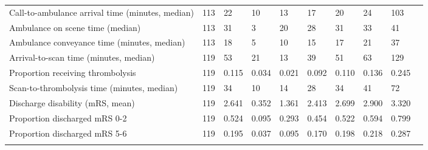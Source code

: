 \begin{minipage}{1\textwidth}
\begin{longtable}{p{7cm} p{1cm} p{0.8cm} p{0.8cm} p{0.8cm} p{0.8cm} p{0.8cm} p{0.8cm} p{0.8cm} p{0.8cm}}
Call-to-ambulance arrival time (minutes, median) & 113 & 22 & 10 & 13 & 17 & 20 & 24 & 103\tabularnewline
Ambulance on scene time (median) & 113 & 31 & 3 & 20 & 28 & 31 & 33 & 41\tabularnewline
Ambulance conveyance time (minutes, median) & 113 & 18 & 5 & 10 & 15 & 17 & 21 & 37\tabularnewline
Arrival-to-scan time (minutes, median) & 119 & 53 & 21 & 13 & 39 & 51 & 63 & 129\tabularnewline
Proportion receiving thrombolysis & 119 & 0.115 & 0.034 & 0.021 & 0.092 & 0.110 & 0.136 & 0.245\tabularnewline
Scan-to-thrombolysis time (minutes, median) & 119 & 34 & 10 & 14 & 28 & 34 & 41 & 72\tabularnewline
Discharge disability (mRS, mean) & 119 & 2.641 & 0.352 & 1.361 & 2.413 & 2.699 & 2.900 & 3.320\tabularnewline
Proportion discharged mRS 0-2 & 119 & 0.524 & 0.095 & 0.293 & 0.454 & 0.522 & 0.594 & 0.799\tabularnewline
Proportion discharged mRS 5-6 & 119 & 0.195 & 0.037 & 0.095 & 0.170 & 0.198 & 0.218 & 0.287\tabularnewline
\bottomrule
\label{tab:hospital_stats_1}
\end{longtable}
\normalsize
\end{minipage}


